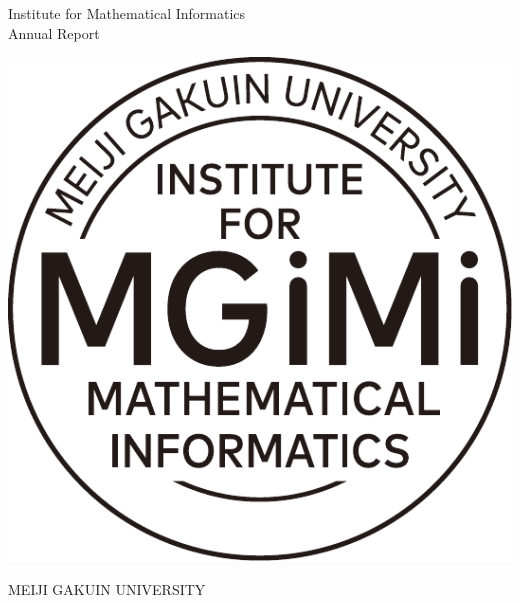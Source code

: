 \documentclass[12pt]{article}
\begin{document}
\setcounter{page}{0}
\thispagestyle{empty}

\vspace*{2cm}

\begin{center}
\Huge{\sffamily Institute for Mathematical Informatics}\\
\vspace{1.5cm}
\Huge{\sffamily Annual Report}\\
\vspace{0.5cm}
\Huge{}

\vfill
\includegraphics[scale=0.75]{circle_logo.pdf}
\vfill

\Huge{M}\Large{EIJI}
\Huge{G}\Large{AKUIN}
\Huge{U}\Large{NIVERSITY}
\end{center}

\vspace{1cm}

\newpage

\pagestyle{fancy}
\fancyhead{}
\fancyfoot{}
\fancyfoot[L]{\TheAuthor}
\fancyfoot[R]{\footnotesize \thepage}
\renewcommand{\footrulewidth}{1pt}
\renewcommand{\headrulewidth}{1pt}

%
%


%
%


 
\end{document}
